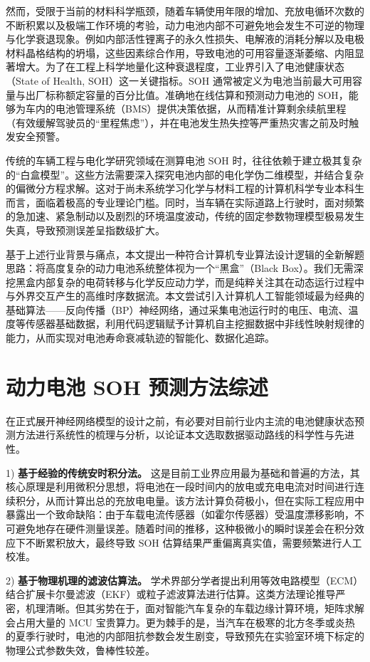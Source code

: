 \documentclass[10pt, a4paper, twocolumn]{ctexart}
\begin{document}
然而，受限于当前的材料科学瓶颈，随着车辆使用年限的增加、充放电循环次数的不断积累以及极端工作环境的考验，动力电池内部不可避免地会发生不可逆的物理与化学衰退现象。例如内部活性锂离子的永久性损失、电解液的消耗分解以及电极材料晶格结构的坍塌，这些因素综合作用，导致电池的可用容量逐渐萎缩、内阻显著增大。为了在工程上科学地量化这种衰退程度，工业界引入了电池健康状态（State of Health, SOH）这一关键指标。SOH 通常被定义为电池当前最大可用容量与出厂标称额定容量的百分比值。准确地在线估算和预测动力电池的 SOH，能够为车内的电池管理系统（BMS）提供决策依据，从而精准计算剩余续航里程（有效缓解驾驶员的“里程焦虑”），并在电池发生热失控等严重热灾害之前及时触发安全预警。

传统的车辆工程与电化学研究领域在测算电池 SOH 时，往往依赖于建立极其复杂的“白盒模型”。这些方法需要深入探究电池内部的电化学伪二维模型，并结合复杂的偏微分方程求解。这对于尚未系统学习化学与材料工程的计算机科学专业本科生而言，面临着极高的专业理论门槛。同时，当车辆在实际道路上行驶时，面对频繁的急加速、紧急制动以及剧烈的环境温度波动，传统的固定参数物理模型极易发生失真，导致预测误差呈指数级扩大。

基于上述行业背景与痛点，本文提出一种符合计算机专业算法设计逻辑的全新解题思路：将高度复杂的动力电池系统整体视为一个“黑盒”（Black Box）。我们无需深挖黑盒内部复杂的电荷转移与化学反应动力学，而是纯粹关注其在动态运行过程中与外界交互产生的高维时序数据流。本文尝试引入计算机人工智能领域最为经典的基础算法——反向传播（BP）神经网络，通过采集电池运行时的电压、电流、温度等传感器基础数据，利用代码逻辑赋予计算机自主挖掘数据中非线性映射规律的能力，从而实现对电池寿命衰减轨迹的智能化、数据化追踪。

\section{动力电池 SOH 预测方法综述}
在正式展开神经网络模型的设计之前，有必要对目前行业内主流的电池健康状态预测方法进行系统性的梳理与分析，以论证本文选取数据驱动路线的科学性与先进性。

1) \textbf{基于经验的传统安时积分法。} 这是目前工业界应用最为基础和普遍的方法，其核心原理是利用微积分思想，将电池在一段时间内的放电或充电电流对时间进行连续积分，从而计算出总的充放电电量。该方法计算负荷极小，但在实际工程应用中暴露出一个致命缺陷：由于车载电流传感器（如霍尔传感器）受温度漂移影响，不可避免地存在硬件测量误差。随着时间的推移，这种极微小的瞬时误差会在积分效应下不断累积放大，最终导致 SOH 估算结果严重偏离真实值，需要频繁进行人工校准。

2) \textbf{基于物理机理的滤波估算法。} 学术界部分学者提出利用等效电路模型（ECM）结合扩展卡尔曼滤波（EKF）或粒子滤波算法进行估算。这类方法理论推导严密，机理清晰。但其劣势在于，面对智能汽车复杂的车载边缘计算环境，矩阵求解会占用大量的 MCU 宝贵算力。更为棘手的是，当汽车在极寒的北方冬季或炎热的夏季行驶时，电池的内部阻抗参数会发生剧变，导致预先在实验室环境下标定的物理公式参数失效，鲁棒性较差。
\end{document}

